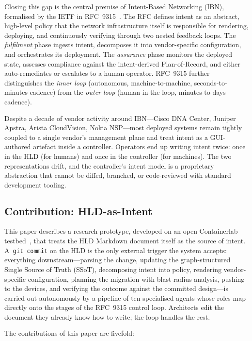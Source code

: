 \documentclass[acmtog]{acmart}
\renewcommand\_{\textunderscore\allowbreak}
\begin{document}
Closing this gap is the central premise of Intent-Based Networking
(IBN), formalised by the IETF in RFC~9315~\cite{rfc9315}. The RFC
defines intent as an abstract, high-level policy that the network
infrastructure itself is responsible for rendering, deploying, and
continuously verifying through two nested feedback loops. The
\emph{fulfilment} phase ingests intent, decomposes it into
vendor-specific configuration, and orchestrates its deployment. The
\emph{assurance} phase monitors the deployed state, assesses
compliance against the intent-derived Plan-of-Record, and either
auto-remediates or escalates to a human operator. RFC~9315 further
distinguishes the \emph{inner loop} (autonomous, machine-to-machine,
seconds-to-minutes cadence) from the \emph{outer loop}
(human-in-the-loop, minutes-to-days cadence).

Despite a decade of vendor activity around IBN---Cisco DNA Center,
Juniper Apstra, Arista CloudVision, Nokia NSP---most deployed systems
remain tightly coupled to a single vendor's management plane and
treat intent as a GUI-authored artefact inside a controller. Operators
end up writing intent twice: once in the HLD (for humans) and once in
the controller (for machines). The two representations drift, and the
controller's intent model is a proprietary abstraction that cannot be
diffed, branched, or code-reviewed with standard development tooling.

\subsection{Contribution: HLD-as-Intent}

This paper describes a research prototype, developed on an open
Containerlab testbed~\cite{containerlab}, that treats the HLD Markdown
document itself as the source of intent. A~\texttt{git commit} on the
HLD is the only external trigger the system accepts: everything
downstream---parsing the change, updating the graph-structured Single
Source of Truth (SSoT), decomposing intent into policy, rendering
vendor-specific configuration, planning the migration with blast-radius
analysis, pushing to the devices, and verifying the outcome against the
committed design---is carried out autonomously by a pipeline of ten
specialised agents whose roles map directly onto the stages of the
RFC~9315 control loop. Architects edit the document they already know
how to write; the loop handles the rest.

The contributions of this paper are fivefold:
\end{document}
